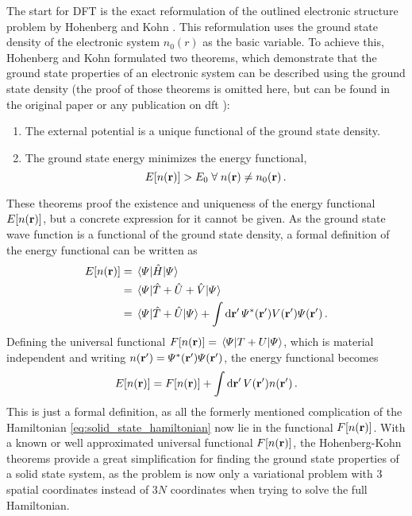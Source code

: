 \documentclass[main.tex]{subfiles}
\begin{document}
The start for DFT is the exact reformulation of the outlined electronic structure problem by Hohenberg and Kohn \cite{hohenberg_inhomogeneous_1964}.
This reformulation uses the ground state density of the electronic system \(n_0 (r)\) as the basic variable.
To achieve this, Hohenberg and Kohn \cite{hohenberg_inhomogeneous_1964} formulated two theorems, which demonstrate that the ground state properties of an electronic system can be described using the ground state density (the proof of those theorems is omitted here, but can be found in the original paper \cite{hohenberg_inhomogeneous_1964} or any publication on \acrshort{dft} \cite{marzari_ab-initio_1996}):
\begin{enumerate}[I]
    \item The external potential is a unique functional of the ground state density.
    \item The ground state energy minimizes the energy functional,
    \[E[n(\vb{r})] > E_0 \;\forall\; n(\vb{r}) \neq n_0 (\vb{r})\,.\]
\end{enumerate}
These theorems proof the existence and uniqueness of the energy functional \(E[n(\vb{r})]\), but a concrete expression for it cannot be given.
As the ground state wave function is a functional of the ground state density, a formal definition of the energy functional can be written as
\begin{align*}
    E[n(\vb{r})] &= \expval{\hat{H}}{\Psi} \\
    &= \expval{\hat{T} + \hat{U} + \hat{V}}{\Psi} \\
    &= \expval{\hat{T} + \hat{U}}{\Psi} + \int \dd{\vb{r}^{\prime}} \Psi^* (\vb{r}^{\prime}) V(\vb{r}^{\prime}) \Psi (\vb{r}^{\prime})\,.
\end{align*}
Defining the universal functional \(F[n(\vb{r})] = \expval{T + U}{\Psi}\), which is material independent and writing \(n (\vb{r}^{\prime}) = \Psi^* (\vb{r}^{\prime}) \Psi (\vb{r}^{\prime})\), the energy functional becomes
\begin{equation}\label{eq:hohenberg_kohn_energy_functional}
    E[n(\vb{r})] = F[n(\vb{r})] + \int \dd{\vb{r}^{\prime}} V(\vb{r}^{\prime}) n (\vb{r}^{\prime})\,.
\end{equation}
This is just a formal definition, as all the formerly mentioned complication of the Hamiltonian \ref{eq:solid_state_hamiltonian} now lie in the functional \(F[n(\vb{r})]\).
With a known or well approximated universal functional \(F[n(\vb{r})]\), the Hohenberg-Kohn theorems provide a great simplification for finding the ground state properties of a solid state system, as the problem is now only a variational problem with 3 spatial coordinates instead of \(3N\) coordinates when trying to solve the full Hamiltonian.
\end{document}
